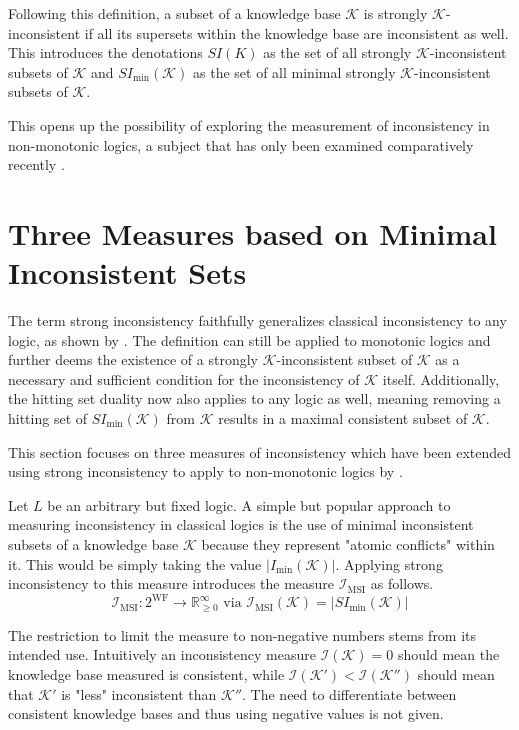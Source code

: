 Following this definition, a subset of a knowledge base \(\mathcal{K}\) is strongly \(\mathcal{K}\)-inconsistent if all its supersets within the knowledge base are inconsistent as well. This introduces the denotations \(SI(K)\) as the set of all strongly \(\mathcal{K}\)-inconsistent subsets of \(\mathcal{K}\) and \(SI_{\min}(\mathcal{K})\) as the set of all minimal strongly \(\mathcal{K}\)-inconsistent subsets of \(\mathcal{K}\).

This opens up the possibility of exploring the measurement of inconsistency in non-monotonic logics, a subject that has only been examined comparatively recently \cite{ulbricht_measuring_2018} \cite{brewka_strong_2019} \cite{ulbricht_handling_2020}.

\section{Three Measures based on Minimal Inconsistent Sets}
The term strong inconsistency faithfully generalizes classical inconsistency to any logic, as shown by \cite{brewka_strong_2017}. The definition can still be applied to monotonic logics and further deems the existence of a strongly \(\mathcal{K}\)-inconsistent subset of \(\mathcal{K}\) as a necessary and sufficient condition for the inconsistency of \(\mathcal{K}\) itself. Additionally, the hitting set duality now also applies to any logic as well, meaning removing a hitting set of \(SI_{\min}(\mathcal{K})\) from \(\mathcal{K}\) results in a maximal consistent subset of \(\mathcal{K}\).

This section focuses on three measures of inconsistency which have been extended using strong inconsistency to apply to non-monotonic logics by \cite{ulbricht_handling_2020}.

Let \(L\) be an arbitrary but fixed logic. A simple but popular approach to measuring inconsistency in classical logics is the use of minimal inconsistent subsets of a knowledge base \(\mathcal{K}\) because they represent "atomic conflicts" within it. This would be simply taking the value \(\left| I_{\min}(\mathcal{K}) \right|\). Applying strong inconsistency to this measure introduces the measure \(\mathcal{I}_{\text{MSI}}\) as follows.\\
\[\mathcal{I}_{\text{MSI}}: 2^{\text{WF}} \rightarrow \mathbb{R}_{\geq 0}^{\infty} \text{ via } \mathcal{I}_{\text{MSI}}(\mathcal{K}) = \left| SI_{\min}(\mathcal{K}) \right|\]

The restriction to limit the measure to non-negative numbers stems from its intended use. Intuitively an inconsistency measure \(\mathcal{I}(\mathcal{K}) = 0\) should mean the knowledge base measured is consistent, while \(\mathcal{I}(\mathcal{K}') < \mathcal{I}(\mathcal{K}'')\) should mean that \(\mathcal{K}'\) is "less" inconsistent than \(\mathcal{K}''\). The need to differentiate between consistent knowledge bases and thus using negative values is not given.

